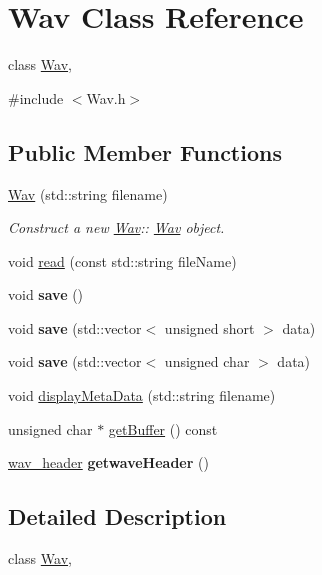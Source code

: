 \hypertarget{classWav}{}\section{Wav Class Reference}
\label{classWav}


class \hyperlink{classWav}{Wav},  




{\ttfamily \#include $<$Wav.\+h$>$}

\subsection*{Public Member Functions}
\begin{DoxyCompactItemize}
\item 
\hyperlink{classWav_a2fee69ab4985c3a3a2a6688a758830e4}{Wav} (std\+::string filename)
\begin{DoxyCompactList}\small\item\em Construct a new \hyperlink{classWav}{Wav}\+:\+: \hyperlink{classWav}{Wav} object. \end{DoxyCompactList}\item 
void \hyperlink{classWav_a4d3a96a00149277de8280d6008a1ba4d}{read} (const std\+::string file\+Name)
\item 
\mbox{\label{classWav_ab8ac2a53df386b529aa432ae3d3341bd}} 
void {\bfseries save} ()
\item 
\mbox{\label{classWav_ad5e4939d730ef4703200c7c0e0703936}} 
void {\bfseries save} (std\+::vector$<$ unsigned short $>$ data)
\item 
\mbox{\label{classWav_aeb77878ba667baec07e05531bae96453}} 
void {\bfseries save} (std\+::vector$<$ unsigned char $>$ data)
\item 
void \hyperlink{classWav_abe9ad7fffa63c476065c42b73ec157fb}{display\+Meta\+Data} (std\+::string filename)
\item 
unsigned char $\ast$ \hyperlink{classWav_aa713fc552ec8d011df0acede14d23295}{get\+Buffer} () const
\item 
\mbox{\label{classWav_aaa8d84c13c358e0b1390144c21b75645}} 
\hyperlink{structwav__header}{wav\+\_\+header} {\bfseries getwave\+Header} ()
\end{DoxyCompactItemize}


\subsection{Detailed Description}
class \hyperlink{classWav}{Wav}, 

